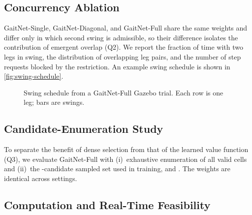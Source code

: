 
\subsection{Concurrency Ablation}
\label{subsec:exp-concurrency}

GaitNet-Single, GaitNet-Diagonal, and GaitNet-Full share the same
weights and differ only in which second swing is admissible, so their
difference isolates the contribution of emergent overlap (Q2). We
report the fraction of time with two legs in swing, the distribution
of overlapping leg pairs, and the number of step requests blocked by
the restriction.  An example swing schedule is shown in
\autoref{fig:swing-schedule}.

\begin{figure}[t]
  \centering
  \caption{Swing schedule from a GaitNet-Full Gazebo trial. Each row
    is one leg; bars are swings.}
  \label{fig:swing-schedule}
\end{figure}

\subsection{Candidate-Enumeration Study}
\label{subsec:exp-enumeration}

To separate the benefit of dense selection from that of the learned
value function (Q3), we evaluate GaitNet-Full with (i)~exhaustive
enumeration of all valid cells and (ii)~the
\corlTrainTotalCandidates-candidate sampled set used in training, and
. The weights are
identical across settings. 

\subsection{Computation and Real-Time Feasibility}
\label{subsec:exp-compute}

